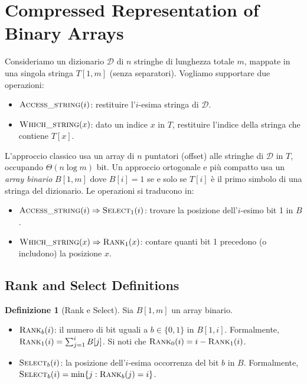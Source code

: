 \documentclass[12pt, a4paper, oneside]{book}
\theoremstyle{plain}
\theoremstyle{definition}
\newtheorem{definizione}[teorema]{Definizione}
\theoremstyle{remark}
\newcommand{\Th}[1]{\Theta\!\left(#1\right)}
\begin{document}
\section{Compressed Representation of Binary Arrays}
\label{sec:rank-select}

Consideriamo un dizionario $\mathcal{D}$ di $n$ stringhe di lunghezza totale $m$, mappate in una singola stringa $T[1,m]$ (senza separatori). Vogliamo supportare due operazioni:
\begin{itemize}
  \item $\textsc{Access\_string}(i)$: restituire l'$i$-esima stringa di $\mathcal{D}$.
  \item $\textsc{Which\_string}(x)$: dato un indice $x$ in $T$, restituire l'indice della stringa che contiene $T[x]$.
\end{itemize}

L'approccio classico usa un array di $n$ puntatori (offset) alle stringhe di $\mathcal{D}$ in $T$, occupando $\Th{n \log m}$ bit. Un approccio ortogonale e più compatto usa un \emph{array binario} $B[1,m]$ dove $B[i] = 1$ se e solo se $T[i]$ è il primo simbolo di una stringa del dizionario. Le operazioni si traducono in:
\begin{itemize}
  \item $\textsc{Access\_string}(i) \Rightarrow \textsc{Select}_1(i)$: trovare la posizione dell'$i$-esimo bit 1 in $B$.
  \item $\textsc{Which\_string}(x) \Rightarrow \textsc{Rank}_1(x)$: contare quanti bit 1 precedono (o includono) la posizione $x$.
\end{itemize}

\subsection{Rank and Select Definitions}
\label{subsec:rank-select-def}

\begin{definizione}[Rank e Select]
\label{def:rank-select}
Sia $B[1,m]$ un array binario.
\begin{itemize}
  \item $\textsc{Rank}_b(i)$: il numero di bit uguali a $b \in \{0, 1\}$ in $B[1, i]$. Formalmente, $\textsc{Rank}_1(i) = \sum_{j=1}^{i} B[j]$. Si noti che $\textsc{Rank}_0(i) = i - \textsc{Rank}_1(i)$.
  \item $\textsc{Select}_b(i)$: la posizione dell'$i$-esima occorrenza del bit $b$ in $B$. Formalmente, $\textsc{Select}_b(i) = \min\{j : \textsc{Rank}_b(j) = i\}$.
\end{itemize}
\end{definizione}
\end{document}
